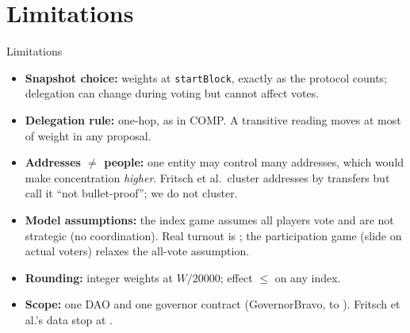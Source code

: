 \documentclass[aspectratio=169,11pt]{beamer}
\begin{document}
\section{Limitations}
\begin{frame}{Limitations}
  \begin{itemize}
    \item \textbf{Snapshot choice:} weights at \texttt{startBlock}, exactly as the protocol counts; delegation can change during voting but cannot affect votes.
    \item \textbf{Delegation rule:} one-hop, as in COMP. A transitive reading moves at most \TransMoved{} of weight in any proposal.
    \item \textbf{Addresses $\ne$ people:} one entity may control many addresses, which would make concentration \emph{higher}. Fritsch et al.\ cluster addresses by transfers but call it ``not bullet-proof''; we do not cluster.
    \item \textbf{Model assumptions:} the index game assumes all players vote and are not strategic (no coordination). Real turnout is \Turnout; the participation game (slide on actual voters) relaxes the all-vote assumption.
    \item \textbf{Rounding:} integer weights at $W/20000$; effect $\le$ \ResDiff{} on any index.
    \item \textbf{Scope:} one DAO and one governor contract (GovernorBravo, \FirstDate{} to \LastDate). Fritsch et al.'s data stop at \FritschDate.
  \end{itemize}
\end{frame}

\end{document}
